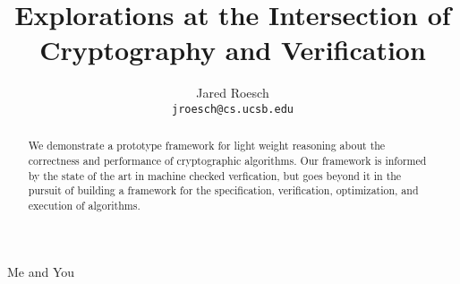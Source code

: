 \documentclass[twocolumn]{IEEEtran}
\begin{document}
\title{Explorations at the Intersection of Cryptography and Verification}

\author{Jared Roesch \\ \texttt{jroesch@cs.ucsb.edu}}

{Me and You}

\maketitle

\begin{abstract}
We demonstrate a prototype framework for light weight reasoning about the
correctness and performance of cryptographic algorithms. Our framework is informed
by the state of the art in machine checked verfication, but goes beyond it in
the pursuit of building a framework for the specification, verification, optimization,
and execution of algorithms.
\end{abstract}







\bigskip
\bigskip



\end{document}
